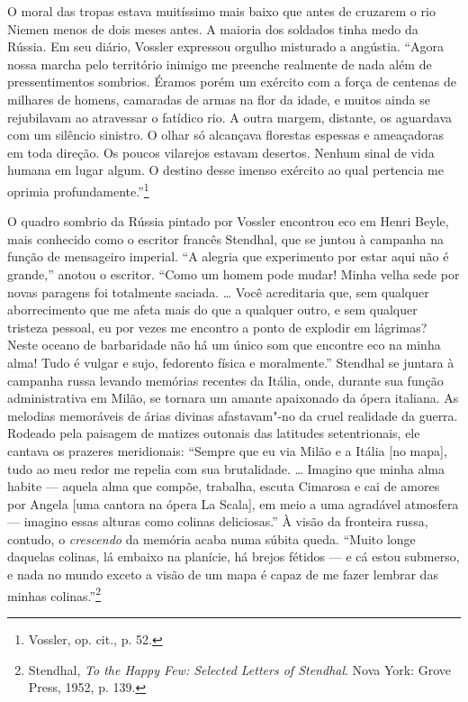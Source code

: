 O moral das tropas estava muitíssimo mais baixo que antes de cruzarem o
rio Niemen menos de dois meses antes. A maioria dos soldados tinha medo
da Rússia. Em seu diário, Vossler expressou orgulho misturado a
angústia. ``Agora nossa marcha pelo território inimigo me preenche
realmente de nada além de pressentimentos sombrios. Éramos porém um
exército com a força de centenas de milhares de homens, camaradas de
armas na flor da idade, e muitos ainda se rejubilavam ao atravessar o
fatídico rio. A outra margem, distante, os aguardava com um silêncio
sinistro. O olhar só alcançava florestas espessas e ameaçadoras em toda
direção. Os poucos vilarejos estavam desertos. Nenhum sinal de vida
humana em lugar algum. O destino desse imenso exército ao qual pertencia
me oprimia profundamente.''\footnote{Vossler, op. cit., p. 52.}

O quadro sombrio da Rússia pintado por Vossler encontrou eco em Henri
Beyle, mais conhecido como o escritor francês Stendhal, que se juntou à
campanha na função de mensageiro imperial. ``A alegria que experimento
por estar aqui não é grande,'' anotou o escritor. ``Como um homem pode
mudar! Minha velha sede por novas paragens foi totalmente saciada.
\ldots{} Você acreditaria que, sem qualquer aborrecimento que me afeta
mais do que a qualquer outro, e sem qualquer tristeza pessoal, eu por
vezes me encontro a ponto de explodir em lágrimas? Neste oceano de
barbaridade não há um único som que encontre eco na minha alma! Tudo é
vulgar e sujo, fedorento física e moralmente.'' Stendhal se juntara à
campanha russa levando memórias recentes da Itália, onde, durante sua
função administrativa em Milão, se tornara um amante apaixonado da ópera
italiana. As melodias memoráveis de árias divinas afastavam"-no da cruel
realidade da guerra. Rodeado pela paisagem de matizes outonais das
latitudes setentrionais, ele cantava os prazeres meridionais: ``Sempre
que eu via Milão e a Itália {[}no mapa{]}, tudo ao meu redor me repelia
com sua brutalidade. \ldots{} Imagino que minha alma habite --- aquela
alma que compõe, trabalha, escuta Cimarosa e cai de amores por Angela
{[}uma cantora na ópera La Scala{]}, em meio a uma agradável atmosfera ---
imagino essas alturas como colinas deliciosas.'' À visão da fronteira
russa, contudo, o \textit{crescendo} da memória acaba numa súbita queda.
``Muito longe daquelas colinas, lá embaixo na planície, há brejos
fétidos --- e cá estou submerso, e nada no mundo exceto a visão de um mapa
é capaz de me fazer lembrar das minhas colinas.''\footnote{Stendhal, \textit{To the Happy Few: Selected Letters of Stendhal}. Nova York: Grove Press, 1952, p. 139.}

